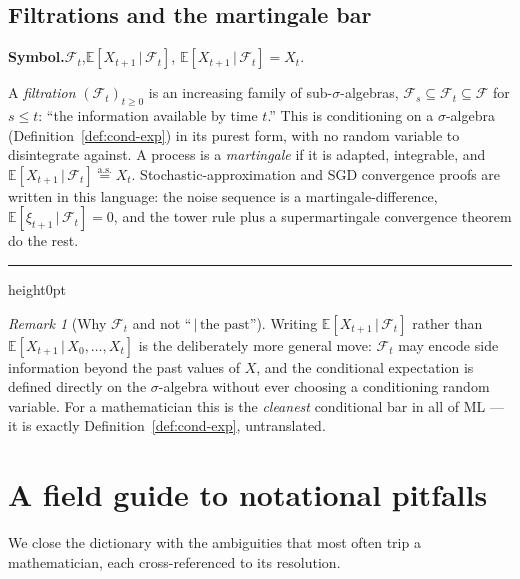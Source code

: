 \documentclass[11pt,oneside]{report}
\theoremstyle{plain}
\theoremstyle{definition}
\theoremstyle{remark}
\newtheorem{remark}[theorem]{Remark}
\newenvironment{mlentry}[1]%
  {\par\medskip\noindent\textbf{Symbol.}\quad #1\par\nobreak\smallskip}%
  {\par\medskip\hrule height0pt\medskip}
\newcommand{\E}{\mathbb{E}}
\newcommand{\Fcal}{\mathcal{F}}
\newcommand{\eqas}{\overset{\text{a.s.}}{=}}
\newcommand{\given}{\,\vert\,}
\numberwithin{equation}{chapter}
\begin{document}
\section{Filtrations and the martingale bar}

\begin{mlentry}{$\Fcal_t$,\quad $\E[X_{t+1}\given\Fcal_t]$,\quad
$\E[X_{t+1}\given\Fcal_t]=X_t$.}
A \emph{filtration} $(\Fcal_t)_{t\ge0}$ is an increasing family of
sub-$\sigma$-algebras, $\Fcal_s\subseteq\Fcal_t\subseteq\Fcal$ for $s\le
t$: ``the information available by time $t$.'' This is conditioning on a
$\sigma$-algebra (Definition~\ref{def:cond-exp}) in its purest form, with
no random variable to disintegrate against. A process is a
\emph{martingale} if it is adapted, integrable, and
$\E[X_{t+1}\given\Fcal_t]\eqas X_t$. Stochastic-approximation and SGD
convergence proofs are written in this language: the noise sequence is a
martingale-difference, $\E[\xi_{t+1}\given\Fcal_t]=0$, and the tower rule
plus a supermartingale convergence theorem do the rest.
\end{mlentry}

\begin{remark}[Why $\Fcal_t$ and not ``$\given\text{the past}$'']
Writing $\E[X_{t+1}\given\Fcal_t]$ rather than $\E[X_{t+1}\given
X_0,\dots,X_t]$ is the deliberately more general move: $\Fcal_t$ may encode
side information beyond the past values of $X$, and the conditional
expectation is defined directly on the $\sigma$-algebra without ever
choosing a conditioning random variable. For a mathematician this is the
\emph{cleanest} conditional bar in all of ML --- it is exactly
Definition~\ref{def:cond-exp}, untranslated.
\end{remark}

\chapter{A field guide to notational pitfalls}\label{ch:pitfalls}

We close the dictionary with the ambiguities that most often trip a
mathematician, each cross-referenced to its resolution.
\end{document}

